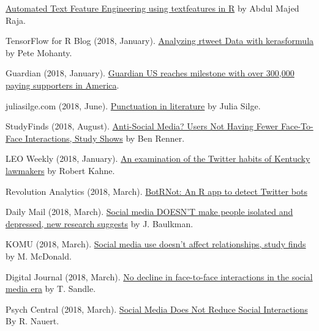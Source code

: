 \begin{bibenum}
      \href{https://datascienceplus.com/automated-text-feature-engineering-using-textfeatures-in-r/}{Automated Text Feature Engineering using textfeatures in R} by Abdul Majed Raja.
    \item[] TensorFlow for R Blog (2018, January).
      \href{https://blogs.rstudio.com/tensorflow/posts/2018-01-24-analyzing-rtweet-data-with-kerasformula/}{Analyzing rtweet Data with kerasformula} by Pete Mohanty.
    \item[] Guardian (2018, January).
      \href{https://www.theguardian.com/gnm-press-office/2018/jan/26/guardian-us-reaches-milestone-with-over-300000-paying-supporters-in-america}{Guardian US reaches milestone with over 300,000 paying supporters in America}.
    \item[] juliasilge.com (2018, June).
      \href{https://juliasilge.com/blog/punctution-literature/}{Punctuation in literature} by Julia Silge.
    \item[] StudyFinds (2018, August).
      \href{https://www.studyfinds.org/social-media-not-decrease-face-face-interaction-study-says/}{Anti-Social Media? Users Not Having Fewer Face-To-Face Interactions, Study Shows} by Ben Renner.
    \item[] LEO Weekly (2018, January).
      \href{https://www.leoweekly.com/2018/01/kentucky-legislature-twitter-analysis/}{An examination of the Twitter habits of Kentucky lawmakers} by Robert Kahne.
    \item[] Revolution Analytics (2018, March).
      \href{http://blog.revolutionanalytics.com/2018/03/twitter-bot-or-not.html}{BotRNot: An R app to detect Twitter bots}
    \item[] Daily Mail (2018, March).
      \href{http://www.dailymail.co.uk/health/article-5455279/Facebook-does-NOT-decrease-social-interaction.html}{Social media DOESN'T make people isolated and depressed, new research suggests} by J. Baulkman.
    \item[] KOMU (2018, March).
      \href{http://www.komu.com/news/social-media-use-doesn-t-affect-relationships-study-finds}{Social media use doesn't affect relationships, study finds} by M. McDonald.
    \item[] Digital Journal (2018, March).
      \href{http://www.digitaljournal.com/tech-and-science/technology/no-decline-in-face-to-face-interactions-in-the-social-media-era/article/516359}{No decline in face-to-face interactions in the social media era} by T. Sandle.
    \item[] Psych Central (2018, March).
      \href{https://psychcentral.com/news/2018/03/02/social-media-does-not-reduce-social-interactions/133209.html}{Social Media Does Not Reduce Social Interactions} By R. Nauert.

\end{bibenum}
